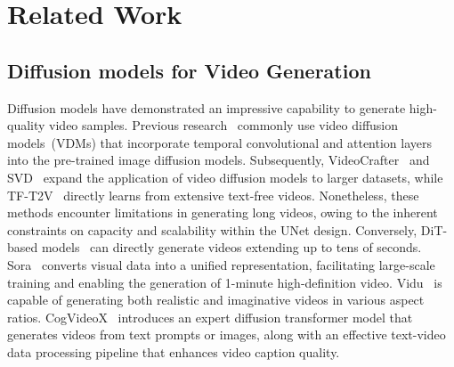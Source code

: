\section{Related Work}
\subsection{Diffusion models for Video Generation}
Diffusion models have demonstrated an impressive capability to generate high-quality video samples. Previous research~\cite{ho2022video, ho2022imagen, singer2022make,khachatryan2023text2video,zhang2023controlvideo} commonly use video diffusion models~(VDMs) that incorporate temporal convolutional and attention layers into the pre-trained image diffusion models. Subsequently, VideoCrafter~\cite{Chen2023VideoCrafter1OD} and SVD~\cite{DBLP:journals/corr/abs-2311-15127} expand the application of video diffusion models to larger datasets, while TF-T2V~\cite{wang2024tf} directly learns from extensive text-free videos. Nonetheless, these methods encounter limitations in generating long videos, owing to the inherent constraints on capacity and scalability within the UNet design. Conversely, DiT-based models~\cite{sora2024, OpenSora,DBLP:journals/corr/abs-2405-04233, yang2024cogvideox, polyak2024movie} can directly generate videos extending up to tens of seconds. Sora~\cite{sora2024} converts visual data into a unified representation, facilitating large-scale training and enabling the generation of 1-minute high-definition video. Vidu~\cite{DBLP:journals/corr/abs-2405-04233} is capable of generating both realistic and imaginative videos in various aspect ratios. CogVideoX~\cite{yang2024cogvideox}  introduces an expert diffusion transformer model that generates videos from text prompts or images, along with an effective text-video data processing pipeline that enhances video caption quality. 


